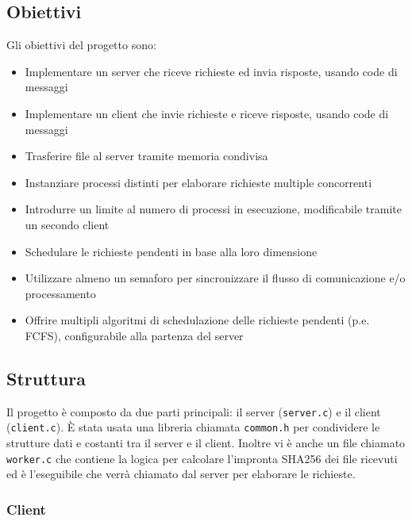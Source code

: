 \documentclass[a4paper]{article}
\begin{document}
\subsection{Obiettivi}

Gli obiettivi del progetto sono:
\begin{itemize}
    \item Implementare un server che riceve richieste ed invia risposte, usando code di messaggi
    \item Implementare un client che invie richieste e riceve risposte, usando code di messaggi
    \item Trasferire file al server tramite memoria condivisa
    \item Instanziare processi distinti per elaborare richieste multiple concorrenti
    \item Introdurre un limite al numero di processi in esecuzione, modificabile 
    tramite un secondo client
    \item Schedulare le richieste pendenti in base alla loro dimensione
    \item Utilizzare almeno un semaforo per sincronizzare il flusso di comunicazione e/o
    processamento
    \item Offrire multipli algoritmi di schedulazione delle richieste pendenti (p.e. FCFS),
    configurabile alla partenza del server
\end{itemize}

\subsection{Struttura}

Il progetto è composto da due parti principali: il server (\texttt{server.c}) e il client (\texttt{client.c}).
È stata usata una libreria chiamata \texttt{common.h} per condividere le strutture dati
e costanti tra il server e il client. Inoltre vi è anche un file chiamato \texttt{worker.c}
che contiene la logica per calcolare l'impronta SHA256 dei file ricevuti ed è l'eseguibile che verrà chiamato
dal server per elaborare le richieste.

\subsubsection{Client} 
\end{document}
